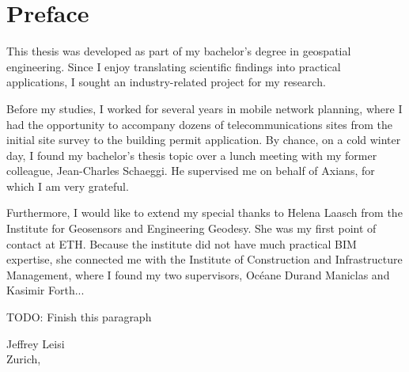 \chapter*{Preface}

This thesis was developed as part of my bachelor's degree in geospatial engineering. Since I enjoy translating scientific findings into practical applications, I sought an industry-related project for my research.

Before my studies, I worked for several years in mobile network planning, where I had the opportunity to accompany dozens of telecommunications sites from the initial site survey to the building permit application. By chance, on a cold winter day, I found my bachelor's thesis topic over a lunch meeting with my former colleague, Jean-Charles Schaeggi. He supervised me on behalf of Axians, for which I am very grateful.

Furthermore, I would like to extend my special thanks to Helena Laasch from the Institute for Geosensors and Engineering Geodesy. She was my first point of contact at ETH. Because the institute did not have much practical BIM expertise, she connected me with the Institute of Construction and Infrastructure Management, where I found my two supervisors, Océane Durand Maniclas and Kasimir Forth...

TODO: Finish this paragraph

\begin{flushright}
Jeffrey Leisi \\
Zurich, \the\year
\end{flushright}